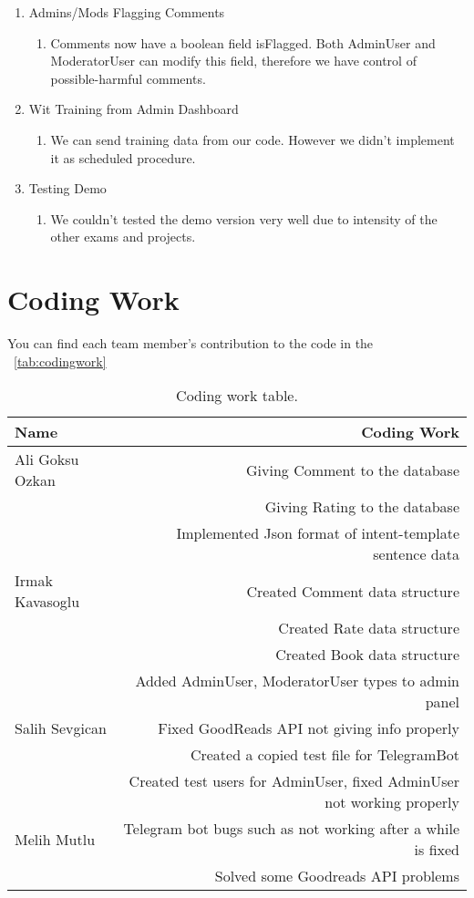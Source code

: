 \documentclass[a4paper]{article}
\begin{document}
\begin{enumerate}
 	\item 	Admins/Mods Flagging Comments
 	\begin{enumerate}
 \item  Comments now have a boolean field isFlagged. Both AdminUser and ModeratorUser can modify this field, therefore we have control of possible-harmful comments.
 	\end{enumerate}
 	\item	Wit Training from Admin Dashboard
 	\begin{enumerate}
 \item	We can send training data from our code. However we didn't implement it as scheduled procedure.
 		\end{enumerate}
  \item	Testing Demo
    \begin{enumerate}
 	  \item  We couldn't tested the demo version very well due to intensity of the other exams and projects.
 	 \end{enumerate}
 \end{enumerate}
\section{Coding Work}
You can find each team member's contribution to the code in the ~\autoref{tab:codingwork}

\begin{table}[!hb]
\centering
\begin{tabular}{l|r}
Name & Coding Work \\\hline
Ali Goksu Ozkan & Giving Comment to the database \\
& Giving Rating to the database \\
& Implemented Json format of intent-template sentence data \\\hline
Irmak Kavasoglu & Created Comment data structure \\
& Created Rate data structure \\
& Created Book data structure \\
& Added AdminUser, ModeratorUser types to admin panel \\\hline
Salih Sevgican & Fixed GoodReads API not giving info properly \\
& Created a copied test file for TelegramBot \\
& Created test users for AdminUser, fixed AdminUser not working properly \\\hline
Melih Mutlu & Telegram bot bugs such as not working after a while is fixed \\
& Solved some Goodreads API problems
\end{tabular}
\caption{\label{tab:codingwork}Coding work table.}
\end{table}
\end{document}
